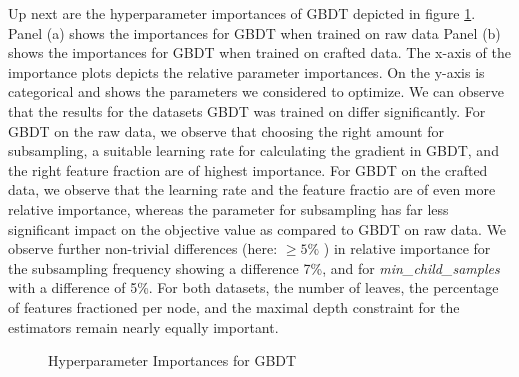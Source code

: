 Up next are the hyperparameter importances of GBDT depicted in figure \ref{fig:GBDT_Importances}. Panel (a) shows the importances for GBDT when trained on raw data
Panel (b) shows the importances for GBDT when trained on crafted data.
The x-axis of the importance plots depicts the relative parameter importances. 
On the y-axis is categorical and shows the parameters we considered to optimize. 
We can observe that the results for the datasets GBDT was trained on differ significantly. 
For GBDT on the raw data, we observe that choosing the right amount for subsampling, a suitable learning rate for calculating the gradient in GBDT, and the right feature fraction are of highest importance. For GBDT on the crafted data, we observe that the learning rate and the feature fractio are of even more relative importance, whereas the parameter for subsampling has far less significant impact on the objective value as compared to GBDT on raw data. 
We observe further non-trivial differences (here: $ \geq 5\%$ ) in relative importance for the subsampling frequency showing a difference 7\%, and for \textit{min\_child\_samples} with a difference of 5\%. For both datasets, the number of leaves, the percentage of features fractioned per node, and the maximal depth constraint for the estimators remain nearly equally important.   
\begin{figure}[h]
	\centering
	\caption{Hyperparameter Importances for GBDT}
	\label{fig:GBDT_Importances}
\end{figure}

